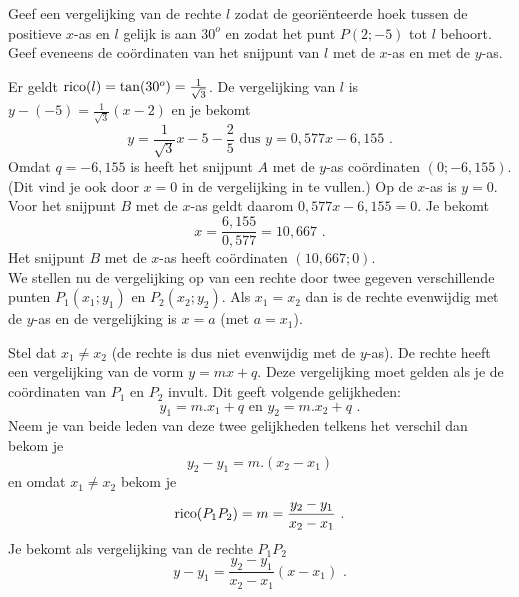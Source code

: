 \begin{voorbeeld}
Geef een vergelijking van de rechte $l$ zodat de geori\"enteerde hoek tussen de positieve $x$-as en $l$ gelijk is aan $30^o$ en zodat het punt $P(2;-5)$ tot  $l$ behoort.
Geef eveneens de co\"ordinaten van het snijpunt van $l$ met de $x$-as en met de $y$-as.

\begin{center}
		
\end{center}




Er geldt $\operatorname{rico} (l)=\tan (30^o)=\frac {1}{\sqrt{3}}$.
De vergelijking van $l$ is $y-(-5)=\frac{1}{\sqrt{3}}(x-2)$ en je bekomt
\[
y=\frac{1}{\sqrt{3}}x-5-\frac{2}{5} \text { dus } y=0,577x-6,155 \text { .}
\]
Omdat $q=-6,155$ is heeft het snijpunt $A$ met de $y$-as co\"ordinaten $(0;-6,155)$.
(Dit vind je ook door $x=0$ in de vergelijking in te vullen.)
Op de $x$-as is $y=0$. Voor het snijpunt $B$ met de $x$-as geldt daarom $0,577x-6,155=0$.
Je bekomt
\[
x=\frac{6,155}{0,577}=10,667 \text { .}
\]
Het snijpunt $B$ met de $x$-as heeft co\"ordinaten $(10,667;0)$.\\

We stellen nu de vergelijking op van een rechte door twee gegeven verschillende punten $P_1(x_1;y_1)$ en $P_2(x_2;y_2)$.
Als $x_1=x_2$ dan is de rechte evenwijdig met de $y$-as en de vergelijking is $x=a$ (met $a=x_1$).

Stel dat $x_1 \neq x_2$ (de rechte is dus niet evenwijdig met de $y$-as).
De rechte heeft een vergelijking van de vorm $y=mx+q$.
Deze vergelijking moet gelden als je de co\"ordinaten van $P_1$ en $P_2$ invult.
Dit geeft volgende gelijkheden:
\[
y_1=m.x_1+q \text { en } y_2=m.x_2+q \text { .}
\]
Neem je van beide leden van deze twee gelijkheden telkens het verschil dan bekom je
\[
y_2-y_1=m.(x_2-x_1) 
\]
en omdat $x_1 \neq x_2$ bekom je
\[
\operatorname{rico} (P_1P_2)=m=\frac {y_2-y_1}{x_2-x_1} \text { .}
\]
Je bekomt als vergelijking van de rechte $P_1P_2$
\[
y-y_1=\frac {y_2-y_1}{x_2-x_1} (x-x_1) \text { .}
\]\\

\end{voorbeeld}


